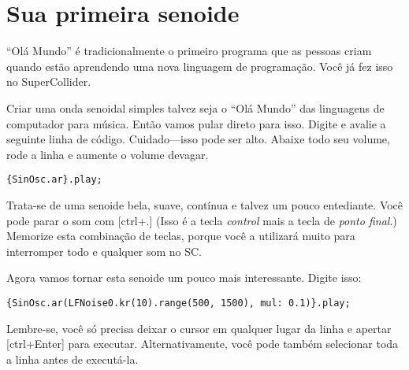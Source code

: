 \section{Sua primeira senoide \label{sec:first-sine}}


“Olá Mundo” é tradicionalmente o primeiro programa que as pessoas criam quando estão aprendendo uma nova linguagem de programação. Você já fez isso no SuperCollider.

Criar uma onda senoidal simples talvez seja o “Olá Mundo” das linguagens de computador para música. Então vamos pular direto para isso. Digite e avalie a seguinte linha de código. Cuidado---isso pode ser alto. Abaixe todo seu volume, rode a linha e aumente o volume devagar.
 
\begin{lstlisting}[style=SuperCollider-IDE, basicstyle=\scttfamily\footnotesize]
{SinOsc.ar}.play;
\end{lstlisting}
 

Trata-se de uma senoide bela, suave, contínua e talvez um pouco entediante. Você pode parar o som com [ctrl+.] (Isso é a tecla \emph{control} mais a tecla de \emph{ponto final}.) Memorize esta combinação de teclas, porque você a utilizará muito para interromper todo e qualquer som no SC.

\bigskip
{}
\bigskip

Agora vamos tornar esta senoide um pouco mais interessante. Digite isso:

 
\begin{lstlisting}[style=SuperCollider-IDE, basicstyle=\scttfamily\footnotesize ]
{SinOsc.ar(LFNoise0.kr(10).range(500, 1500), mul: 0.1)}.play;
\end{lstlisting}
 

Lembre-se, você só precisa deixar o cursor em qualquer lugar da linha e apertar [ctrl+Enter] para executar. Alternativamente, você pode também selecionar toda a linha antes de executá-la.

 
\bigskip
{}
